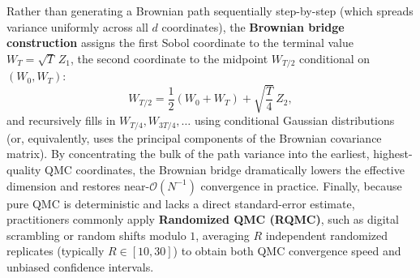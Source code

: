 Rather than generating a Brownian path sequentially step-by-step (which spreads variance uniformly across all $d$ coordinates), the \textbf{Brownian bridge construction} assigns the first Sobol coordinate to the terminal value $W_T = \sqrt{T}\,Z_1$, the second coordinate to the midpoint $W_{T/2}$ conditional on $(W_0, W_T)$:
\[
W_{T/2} = \frac{1}{2}(W_0 + W_T) + \sqrt{\frac{T}{4}}\,Z_2,
\]
and recursively fills in $W_{T/4}, W_{3T/4}, \ldots$ using conditional Gaussian distributions (or, equivalently, uses the principal components of the Brownian covariance matrix). By concentrating the bulk of the path variance into the earliest, highest-quality QMC coordinates, the Brownian bridge dramatically lowers the effective dimension and restores near-$\mathcal{O}(N^{-1})$ convergence in practice. Finally, because pure QMC is deterministic and lacks a direct standard-error estimate, practitioners commonly apply \textbf{Randomized QMC (RQMC)}, such as digital scrambling or random shifts modulo $1$, averaging $R$ independent randomized replicates (typically $R \in [10, 30]$) to obtain both QMC convergence speed and unbiased confidence intervals.
